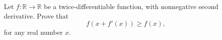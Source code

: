 \begin{problem}
    Let \( f : \mathbb{R} \to \mathbb{R} \) be a twice-differentiable function, with nonnegative second derivative. Prove that
    \[
        f\left(x + f'\left(x\right)\right) \geq f\left(x\right),
    \]
    for any real number \( x \).
\end{problem}
